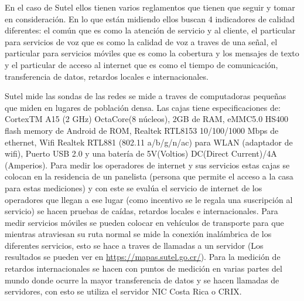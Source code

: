 \documentclass[stu, 12pt, letterpaper, donotrepeattitle, floatsintext, natbib, helv]{apa7}
\begin{document}
\quad En el caso de Sutel ellos tienen varios reglamentos que tienen que seguir y tomar en consideración. En lo que están midiendo ellos buscan 4 indicadores de calidad diferentes: el común que es como la atención de servicio y al cliente, el particular para servicios de voz que es como la calidad de voz a traves de una señal, el particular para servicios móviles que es como la cobertura y los mensajes de texto y el particular de acceso al internet que es como el tiempo de comunicación, transferencia de datos, retardos locales e internacionales. 

\quad Sutel mide las sondas de las redes se mide a traves de computadoras pequeñas que miden en lugares de población densa. Las cajas tiene especificaciones de: CortexTM A15 (2 GHz) OctaCore(8 núcleos), 2GB de RAM, eMMC5.0 HS400 flash memory de Android de ROM, Realtek RTL8153 10/100/1000 Mbps de ethernet, Wifi Realtek RTL881 (802.11 a/b/g/n/ac) para WLAN (adaptador de wifi), Puerto USB 2.0 y una batería de 5V(Voltios) DC(Direct Current)/4A (Amperios). Para medir los operadores de internet y sus servicios estas cajas se colocan en la residencia de un panelista (persona que permite el acceso a la casa para estas mediciones) y con este se evalúa el servicio de internet de los operadores que llegan a ese lugar (como incentivo se le regala una suscripción al servicio) se hacen pruebas de caídas, retardos locales e internacionales. Para medir servicios móviles se pueden colocar en vehículos de transporte para que mientras atraviesan su ruta normal se mide la conexión inalámbrica de los diferentes servicios, esto se hace a traves de llamadas a un servidor (Los resultados se pueden ver en {\href{https://mapas.sutel.go.cr/}{\underline{https://mapas.sutel.go.cr/}}}{}). Para la medición de retardos internacionales se hacen con puntos de medición en varias partes del mundo donde ocurre la mayor transferencia de datos y se hacen llamadas de servidores, con esto se utiliza el servidor NIC Costa Rica o CRIX. 
\end{document}
